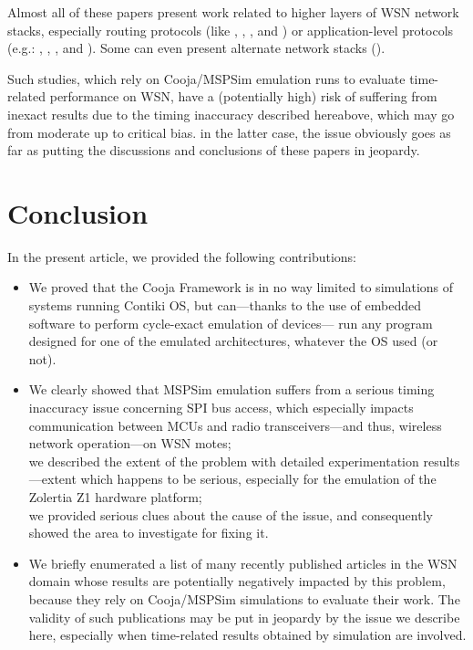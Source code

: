 \documentclass[10pt]{ewsn-proc}
\begin{document}
\smallskip

Almost all of these papers present work related to higher layers of
WSN network stacks, especially routing protocols (like
\cite{Constrain-Routing-Trees-2014},
\cite{Co-RPL-2014}, \cite{IETF-Routing-WSN-2014},
and \cite{Trickle-L2-2014})
or application-level protocols (e.g.: \cite{DINAS-2014},
\cite{Efficient-Distrib-Svc-Discovery-2014},
\cite{Visual-Sensor-Networks-2014}, and \cite{Key-Mgmt-2015}).
Some can even present alternate network stacks (\cite{TinySDN-2014}).

\bigskip

Such studies, which rely on Cooja/MSPSim emulation runs to evaluate
time-related performance on WSN, have a (potentially high) risk of
suffering from inexact results due to the timing inaccuracy described
hereabove, which may go from moderate up to critical bias.
in the latter case, the issue obviously goes as far as putting
the discussions and conclusions of these papers in jeopardy.



\section{Conclusion}
\label{conclusion}

In the present article, we provided the following contributions:
\begin{itemize}
\item We proved that the Cooja Framework is in no way limited to simulations
of systems running Contiki OS, but can---thanks to the use of embedded
software to perform cycle-exact emulation of devices--- run any program
designed for one of the emulated architectures, whatever the OS used
(or not).
\item We clearly showed that MSPSim emulation suffers from a serious timing
inaccuracy issue concerning SPI bus access, which especially impacts
communication between MCUs and radio transceivers---and thus, wireless
network operation---on WSN motes;\\
we described the extent of the problem with detailed experimentation
results---extent which happens to be serious, especially for the emulation
of the Zolertia Z1 hardware platform;\\
we provided serious clues about the cause of the issue, and
consequently showed the area to investigate for fixing it.
\item We briefly enumerated a list of many recently published articles in the
WSN domain whose results are potentially negatively impacted by this problem,
because they rely on Cooja/MSPSim simulations to evaluate their work.
The validity of such publications may be put in jeopardy by the
issue we describe here, especially when time-related results
obtained by simulation are involved.
\end{itemize}
\end{document}
